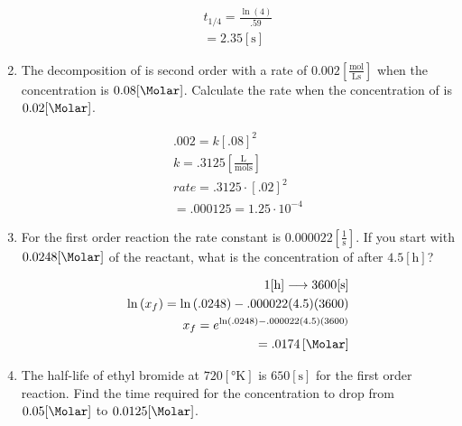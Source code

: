 \documentclass[12pt]{article}
\begin{document}
\begin{enumerate}
    \begin{equation}
      \begin{split}
        t_{1/4}=\frac{\ln(4)}{.59}\\
        =2.35[\si{\second}]
      \end{split}
      \label{3}
    \end{equation}

  \item The decomposition of  is second order with a rate of $0.002\left[ \frac{\si{\mole}}{\si{\liter\second}} \right]$ when the concentration is $0.08[\si{\Molar}]$. Calculate the rate when the concentration of  is $0.02[\si{\Molar}]$.

    \begin{equation}
      \begin{split}
        .002=k[.08]^2\\
        k=.3125\left[ \frac{\si{\liter}}{\si{\mole\second}} \right]\\
        rate=.3125\cdot[.02]^2\\
        =.000125=1.25\cdot10^{-4}
      \end{split}
      \label{4}
    \end{equation}

  \item For the first order reaction  the rate constant is $0.000022\left[ \frac{1}{\si{\second}} \right]$. If you start with $0.0248[\si{\Molar}]$ of the reactant, what is the concentration of  after $4.5[\si{\hour}]$?

    \begin{equation}
      \begin{split}
        1[\si{\hour}]\longrightarrow3600[\si{\second}]\\
        \ln\left( x_f \right)=\ln\left( .0248 \right)-.000022(4.5)(3600)\\
        x_f=e^{\ln(.0248)-.000022(4.5)(3600)}\\
      =.0174\left[ \si{\Molar} \right]
      \end{split}
      \label{5}
    \end{equation}

  \item The half-life of ethyl bromide at $720[\si{\degree\kelvin}]$ is $650\left[ \si{\second} \right]$ for the first order reaction. Find the time required for the concentration to drop from $0.05[\si{\Molar}]$ to $0.0125[\si{\Molar}]$.


\end{enumerate}
\end{document}
